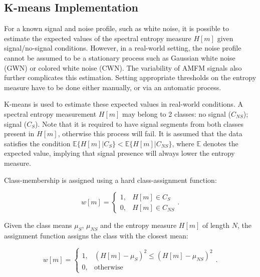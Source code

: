 \begin{subappendices}
	\section{K-means Implementation}
	\label{app:kmeans}
	For a known signal and noise profile, such as white noise, it is possible to estimate the expected values of the spectral entropy measure $H[m]$ given signal/no-signal conditions. However, in a real-world setting, the noise profile cannot be assumed to be a stationary process such as Gaussian white noise (GWN) or colored white noise (CWN). The variability of AMFM signals also further complicates this estimation. Setting appropriate thresholds on the entropy measure have to be done either manually, or via an automatic process. 
	
	K-means is used to estimate these expected values in real-world conditions. A spectral entropy measurement $H[m]$ may belong to 2 classes: no signal ($C_{NS}$); signal ($C_S$). Note that it is required to have signal segments from both classes present in $H[m]$, otherwise this process will fail. It is assumed that the data satisfies the condition $\mathbb{E}\{H[m] | C_{S}\} < \mathbb{E}\{H[m] | C_{NS}\}$, where $\mathbb{E}$ denotes the expected value, implying that signal presence will always lower the entropy measure.
	
	Class-membership is assigned using a hard class-assignment function:
	
	\begin{equation*}
		w[m] = \begin{cases}
			1, & H[m] \in C_S\\
			0, & H[m] \in C_{NS}
		\end{cases}.
	\end{equation*}
	
	Given the class means $\mu_S$, $\mu_{NS}$ and the entropy measure $H[m]$ of length $N$, the assignment function assigns the class with the closest mean:
	
	\begin{equation} 
	\label{eqn:classassign}
		w[m] = \begin{cases}
			1, & (H[m] - \mu_S)^2 \leq (H[m] - \mu_{NS})^2 \\
			0, & \text{otherwise}
		\end{cases}.
	\end{equation}
	

\end{subappendices}
